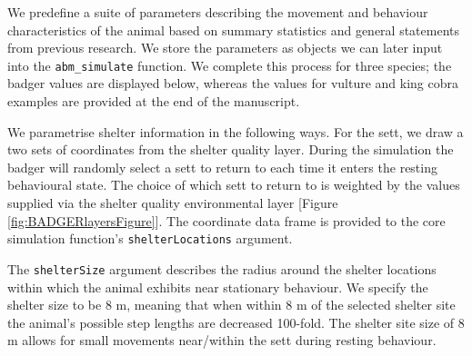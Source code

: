 \documentclass[10pt,a4paper]{article}
\newenvironment{Shaded}{}{}
\newcommand{\AttributeTok}[1]{#1}
\newcommand{\ConstantTok}[1]{#1}
\newcommand{\DecValTok}[1]{#1}
\newcommand{\FloatTok}[1]{#1}
\newcommand{\FunctionTok}[1]{#1}
\newcommand{\NormalTok}[1]{#1}
\newcommand{\OtherTok}[1]{#1}
\newcommand{\SpecialCharTok}[1]{#1}
\newcommand{\StringTok}[1]{#1}
\begin{document}
We predefine a suite of parameters describing the movement and behaviour characteristics of the animal based on summary statistics and general statements from previous research.
We store the parameters as objects we can later input into the \texttt{abm\_simulate} function.
We complete this process for three species; the badger values are displayed below, whereas the values for vulture and king cobra examples are provided at the end of the manuscript.

We parametrise shelter information in the following ways.
For the sett, we draw a two sets of coordinates from the shelter quality layer.
During the simulation the badger will randomly select a sett to return to each time it enters the resting behavioural state.
The choice of which sett to return to is weighted by the values supplied via the shelter quality environmental layer {[}Figure \ref{fig:BADGERlayersFigure}{]}.
The coordinate data frame is provided to the core simulation function's \texttt{shelterLocations} argument.

The \texttt{shelterSize} argument describes the radius around the shelter locations within which the animal exhibits near stationary behaviour.
We specify the shelter size to be 8 m, meaning that when within 8 m of the selected shelter site the animal's possible step lengths are decreased 100-fold.
The shelter site size of 8 m allows for small movements near/within the sett during resting behaviour.

\begin{Shaded}
\end{Shaded}
\end{document}
